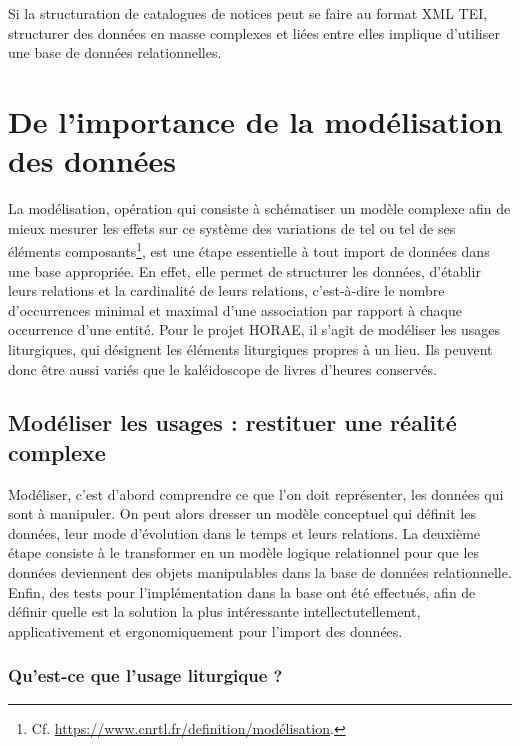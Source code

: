 \documentclass[a4paper,12pt,twoside]{book}
\begin{document}
	Si la structuration de catalogues de notices peut se faire au format XML TEI, structurer des données en masse complexes et liées entre elles implique d’utiliser une base de données relationnelles. 

	
	\chapter{\label{modelisation}De l’importance de la modélisation des données}
	
	La modélisation, opération qui consiste à schématiser un modèle complexe afin de mieux \og mesurer les effets sur ce système des variations de tel ou tel de ses éléments composants\fg{}\footnote{Cf. \url{https://www.cnrtl.fr/definition/modélisation}.}, est une étape essentielle à tout import de données dans une base appropriée. En effet, elle permet de structurer les données, d'établir leurs relations et la cardinalité de leurs relations, c'est-à-dire le nombre d'occurrences minimal et maximal d'une association par rapport à chaque occurrence d'une entité. Pour le projet HORAE, il s'agit de modéliser les usages liturgiques, qui désignent les éléments liturgiques propres à un lieu. Ils peuvent donc être aussi variés que le kaléidoscope de livres d'heures conservés.

	\section{Modéliser les usages : restituer une réalité complexe }
	
	Modéliser, c'est d'abord comprendre ce que l'on doit représenter, les données qui sont à manipuler. On peut alors dresser un modèle conceptuel qui définit les données, leur mode d'évolution dans le temps et leurs relations. La deuxième étape consiste à le transformer en un modèle logique relationnel pour que les données deviennent des objets manipulables dans la base de données relationnelle. Enfin, des tests pour l'implémentation dans la base ont été effectués, afin de définir quelle est la solution la plus intéressante intellectutellement, applicativement et ergonomiquement pour l'import des données.
	
	\subsection{Qu’est-ce que l'usage liturgique ?}
	
\end{document}
